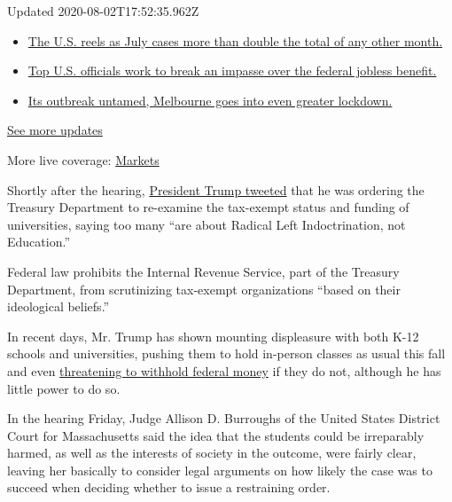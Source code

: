 Updated 2020-08-02T17:52:35.962Z

\begin{itemize}
\tightlist
\item
  \href{https://www.nytimes.com/2020/08/01/world/coronavirus-covid-19.html?action=click\&pgtype=Article\&state=default\&region=MAIN_CONTENT_1\&context=storylines_live_updates\#link-34047410}{The
  U.S. reels as July cases more than double the total of any other
  month.}
\item
  \href{https://www.nytimes.com/2020/08/01/world/coronavirus-covid-19.html?action=click\&pgtype=Article\&state=default\&region=MAIN_CONTENT_1\&context=storylines_live_updates\#link-780ec966}{Top
  U.S. officials work to break an impasse over the federal jobless
  benefit.}
\item
  \href{https://www.nytimes.com/2020/08/01/world/coronavirus-covid-19.html?action=click\&pgtype=Article\&state=default\&region=MAIN_CONTENT_1\&context=storylines_live_updates\#link-2bc8948}{Its
  outbreak untamed, Melbourne goes into even greater lockdown.}
\end{itemize}

\href{https://www.nytimes.com/2020/08/01/world/coronavirus-covid-19.html?action=click\&pgtype=Article\&state=default\&region=MAIN_CONTENT_1\&context=storylines_live_updates}{See
more updates}

More live coverage:
\href{https://www.nytimes.com/live/2020/07/31/business/stock-market-today-coronavirus?action=click\&pgtype=Article\&state=default\&region=MAIN_CONTENT_1\&context=storylines_live_updates}{Markets}

Shortly after the hearing,
\href{https://twitter.com/realDonaldTrump/status/1281616586273468416}{President
Trump tweeted} that he was ordering the Treasury Department to
re-examine the tax-exempt status and funding of universities, saying too
many ``are about Radical Left Indoctrination, not Education.''

Federal law prohibits the Internal Revenue Service, part of the Treasury
Department, from scrutinizing tax-exempt organizations ``based on their
ideological beliefs.''

In recent days, Mr. Trump has shown mounting displeasure with both K-12
schools and universities, pushing them to hold in-person classes as
usual this fall and even
\href{https://www.nytimes.com/2020/07/09/us/schools-reopening-trump.html}{threatening
to withhold federal money} if they do not, although he has little power
to do so.

In the hearing Friday, Judge Allison D. Burroughs of the United States
District Court for Massachusetts said the idea that the students could
be irreparably harmed, as well as the interests of society in the
outcome, were fairly clear, leaving her basically to consider legal
arguments on how likely the case was to succeed when deciding whether to
issue a restraining order.

